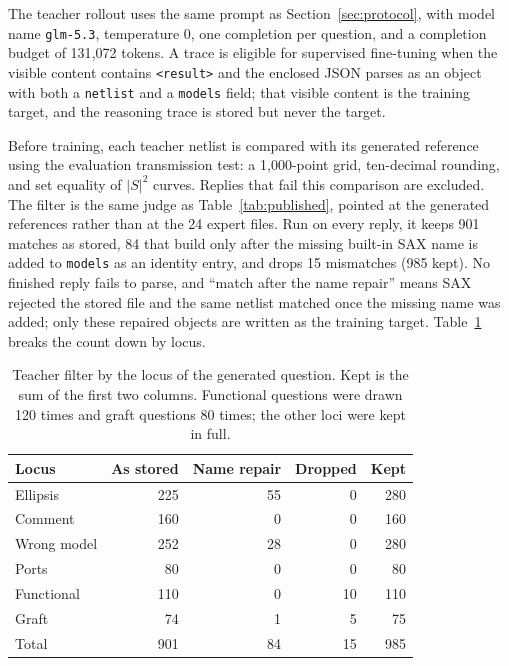 \documentclass[11pt]{article}
\begin{document}
The teacher rollout uses the same prompt as Section~\ref{sec:protocol}, with model name \texttt{glm-5.3}, temperature $0$, one completion per question, and a completion budget of 131{,}072 tokens. A trace is eligible for supervised fine-tuning when the visible content contains \texttt{\textless result\textgreater} and the enclosed JSON parses as an object with both a \texttt{netlist} and a \texttt{models} field; that visible content is the training target, and the reasoning trace is stored but never the target.

Before training, each teacher netlist is compared with its generated reference using the evaluation transmission test: a 1{,}000-point grid, ten-decimal rounding, and set equality of $|S|^2$ curves. Replies that fail this comparison are excluded.
The filter is the same judge as Table~\ref{tab:published}, pointed at the generated references rather than at the 24 expert files.
Run on every reply, it keeps 901 matches as stored, 84 that build only after the missing built-in SAX name is added to \texttt{models} as an identity entry, and drops 15 mismatches (985 kept).
No finished reply fails to parse, and ``match after the name repair'' means SAX rejected the stored file and the same netlist matched once the missing name was added; only these repaired objects are written as the training target.
Table~\ref{tab:teacherlocus} breaks the count down by locus.

\begin{table}[H]
\caption{Teacher filter by the locus of the generated question.
Kept is the sum of the first two columns.
Functional questions were drawn 120 times and graft questions 80 times; the other loci were kept in full.}
\label{tab:teacherlocus}
\begin{center}
\begin{small}
\begin{tabular}{lrrrr}
\toprule
Locus & As stored & Name repair & Dropped & Kept \\
\midrule
Ellipsis & 225 & 55 & 0 & 280 \\
Comment & 160 & 0 & 0 & 160 \\
Wrong model & 252 & 28 & 0 & 280 \\
Ports & 80 & 0 & 0 & 80 \\
Functional & 110 & 0 & 10 & 110 \\
Graft & 74 & 1 & 5 & 75 \\
\midrule
Total & 901 & 84 & 15 & 985 \\
\bottomrule
\end{tabular}
\end{small}
\end{center}
\end{table}
\end{document}
